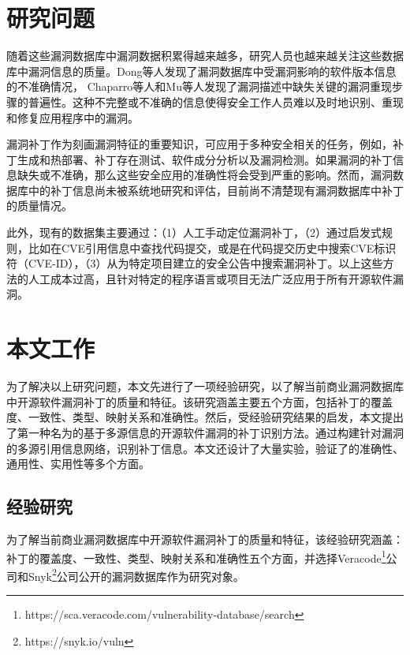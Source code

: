 \section{研究问题}
随着这些漏洞数据库中漏洞数据积累得越来越多，研究人员也越来越关注这些数据库中漏洞信息的质量。Dong等人\cite{dong2019towards}发现了漏洞数据库中受漏洞影响的软件版本信息的不准确情况，
Chaparro等人\cite{chaparro2017detecting}和Mu等人\cite{mu2018understanding}发现了漏洞描述中缺失关键的漏洞重现步骤的普遍性。这种不完整或不准确的信息使得安全工作人员难以及时地识别、重现和修复应用程序中的漏洞。

漏洞补丁作为刻画漏洞特征的重要知识，可应用于多种安全相关的任务，例如，补丁生成和热部署\cite{mulliner2013patchdroid,duan2019automating,xu2020automatic}、补丁存在测试\cite{zhang2018precise,jiang2020pdiff,dai2020bscout}、软件成分分析\cite{ponta2020detection,pashchenko2020vuln4real,Wang2020empirical}以及漏洞检测\cite{li2016vulpecker,li2018vuldeepecker,jang2012redebug,kim2017vuddy, xiao2020mvp, cui2020vuldetector}。如果漏洞的补丁信息缺失或不准确，那么这些安全应用的准确性将会受到严重的影响。然而，漏洞数据库中的补丁信息尚未被系统地研究和评估，目前尚不清楚现有漏洞数据库中补丁的质量情况。

此外，现有的数据集主要通过：（1）人工手动定位漏洞补丁\cite{xu2020automatic,jiang2020pdiff,dai2020bscout,zhou2017automated,sabetta2018practical,chen2020machine,xiao2020mvp,ponta2020detection,pashchenko2020vuln4real}，（2）通过启发式规则，比如在CVE引用信息中查找代码提交\cite{duan2019automating,li2016vulpecker}，或是在代码提交历史中搜索CVE标识符（CVE-ID）\cite{you2017semfuzz,Wang2020empirical}，（3）从为特定项目建立的安全公告中搜索漏洞补丁\cite{mulliner2013patchdroid,jang2012redebug,kim2017vuddy}。以上这些方法的人工成本过高，且针对特定的程序语言或项目无法广泛应用于所有开源软件漏洞。

\section{本文工作}
为了解决以上研究问题，本文先进行了一项经验研究，以了解当前商业漏洞数据库中开源软件漏洞补丁的质量和特征。该研究涵盖主要五个方面，包括补丁的覆盖度、一致性、类型、映射关系和准确性。然后，受经验研究结果的启发，本文提出了第一种名为\tool 的基于多源信息的开源软件漏洞的补丁识别方法。通过构建针对漏洞的多源引用信息网络，识别补丁信息。本文还设计了大量实验，验证了\tool 的准确性、通用性、实用性等多个方面。

\subsection{经验研究}
为了解当前商业漏洞数据库中开源软件漏洞补丁的质量和特征，该经验研究涵盖：补丁的覆盖度、一致性、类型、映射关系和准确性五个方面，并选择Veracode\footnote{https://sca.veracode.com/vulnerability-database/search}公司和Snyk\footnote{https://snyk.io/vuln}公司公开的漏洞数据库作为研究对象。

